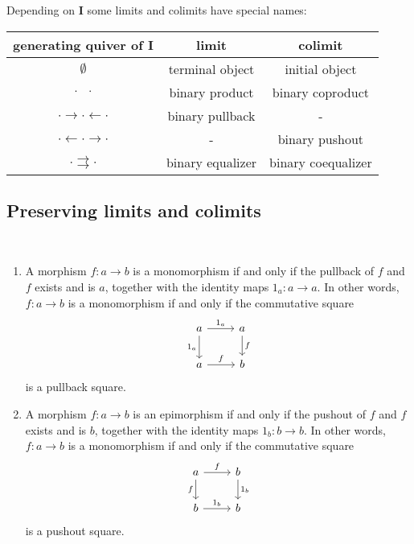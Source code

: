 \begin{example}\label{ex:limits}
Depending on \textbf{I} some limits and colimits have special names:
\begin{center}
\begin{tabular}{c|c|c}
generating quiver of $\mathbf{I}$ & limit & colimit \\
\hline
$\emptyset$ & terminal object & initial object \\
$\cdot \text{\phantom{$\rightarrow$}} \cdot$ & binary product & binary coproduct \\
$\cdot \rightarrow \cdot \leftarrow \cdot$ & binary pullback & - \\
$\cdot \leftarrow \cdot \rightarrow \cdot$  & - & binary pushout \\
$ \cdot \rightrightarrows \cdot$ & binary equalizer & binary coequalizer
\end{tabular}
\end{center}
\end{example}

\subsection{Preserving limits and colimits}

\begin{lemma}\label{prop:mono_pullback}\phantom{}\\
\begin{enumerate}
\renewcommand{\labelenumi}{(\theenumi)}
\item A morphism $f : a \rightarrow b$ is a monomorphism if and only if
the pullback of $f$ and $f$ exists and is $a$, together with the identity maps $1_{a} : a \rightarrow a$.
In other words, $f : a \rightarrow b$ is a monomorphism if and only if the commutative square
\[
\begin{tikzcd}
a \arrow[r, "1_{a}"] \arrow[d, "1_{a}"'] & a \arrow[d, "f"] \\
a \arrow[r, "f"]                         & b               
\end{tikzcd}
\]
is a pullback square.
\item A morphism $f : a \rightarrow b$ is an epimorphism if and only if
the pushout of $f$ and $f$ exists and is $b$, together with the identity maps $1_{b} : b \rightarrow b$.
In other words, $f : a \rightarrow b$ is a monomorphism if and only if the commutative square
\[
\begin{tikzcd}
a \arrow[r, "f"] \arrow[d, "f"'] & b \arrow[d, "1_{b}"] \\
b \arrow[r, "1_{b}"]                         & b               
\end{tikzcd}
\]
is a pushout square.
\end{enumerate}
\end{lemma}

